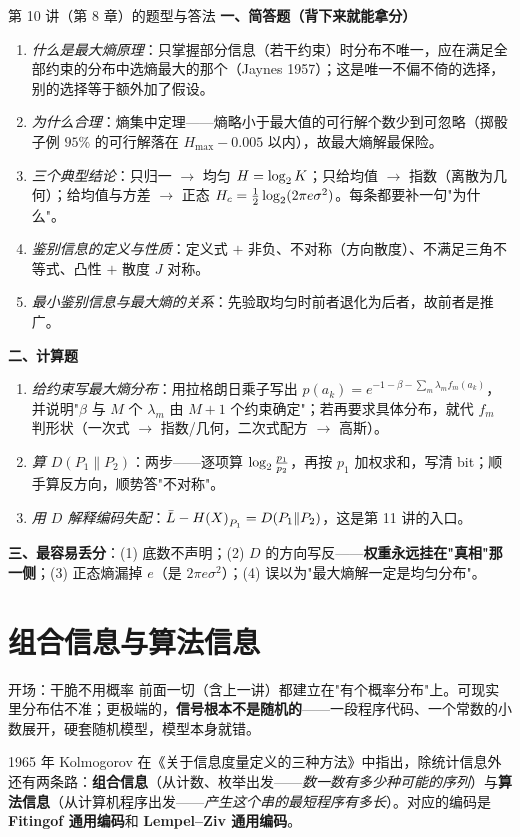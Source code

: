 \begin{exam}{第 10 讲（第 8 章）的题型与答法}
\textbf{一、简答题（背下来就能拿分）}
\begin{enumerate}[leftmargin=1.6em,itemsep=1pt,topsep=2pt]
\item \emph{什么是最大熵原理}：只掌握部分信息（若干约束）时分布不唯一，应在满足全部约束的分布中选熵最大的那个（Jaynes 1957）；这是唯一不偏不倚的选择，别的选择等于额外加了假设。
\item \emph{为什么合理}：熵集中定理——熵略小于最大值的可行解个数少到可忽略（掷骰子例 $95\%$ 的可行解落在 $H_{\max}-0.005$ 以内），故最大熵解最保险。
\item \emph{三个典型结论}：只归一 $\to$ 均匀 $H=\log_{2} K$；只给均值 $\to$ 指数（离散为几何）；给均值与方差 $\to$ 正态 $H_c=\frac12\log_{2}(2\pi e\sigma^2)$。每条都要补一句"为什么"。
\item \emph{鉴别信息的定义与性质}：定义式 $+$ 非负、不对称（方向散度）、不满足三角不等式、凸性 $+$ 散度 $J$ 对称。
\item \emph{最小鉴别信息与最大熵的关系}：先验取均匀时前者退化为后者，故前者是推广。
\end{enumerate}

\textbf{二、计算题}
\begin{enumerate}[leftmargin=1.6em,itemsep=1pt,topsep=2pt]
\item \emph{给约束写最大熵分布}：用拉格朗日乘子写出 $p(a_k)=e^{-1-\beta-\sum_m\lambda_m f_m(a_k)}$，并说明"$\beta$ 与 $M$ 个 $\lambda_m$ 由 $M+1$ 个约束确定"；若再要求具体分布，就代 $f_m$ 判形状（一次式 $\to$ 指数/几何，二次式配方 $\to$ 高斯）。
\item \emph{算 $D(P_1\|P_2)$}：两步——逐项算 $\log_{2}\frac{p_1}{p_2}$，再按 $p_1$ 加权求和，写清 bit；顺手算反方向，顺势答"不对称"。
\item \emph{用 $D$ 解释编码失配}：$\bar L-H\!\left(X\right)_{P_1}=D(P_1\|P_2)$，这是第 11 讲的入口。
\end{enumerate}

\textbf{三、最容易丢分}：(1) 底数不声明；(2) $D$ 的方向写反——\textbf{权重永远挂在"真相"那一侧}；(3) 正态熵漏掉 $e$（是 $2\pi e\sigma^2$）；(4) 误以为"最大熵解一定是均匀分布"。
\end{exam}

\section{组合信息与算法信息}

\begin{idea}{开场：干脆不用概率}
前面一切（含上一讲）都建立在"有个概率分布"上。可现实里分布估不准；更极端的，\textbf{信号根本不是随机的}——一段程序代码、一个常数的小数展开，硬套随机模型，模型本身就错。

1965 年 Kolmogorov 在《关于信息度量定义的三种方法》中指出，除统计信息外还有两条路：\textbf{组合信息}（从计数、枚举出发——\emph{数一数有多少种可能的序列}）与\textbf{算法信息}（从计算机程序出发——\emph{产生这个串的最短程序有多长}）。对应的编码是 \textbf{Fitingof 通用编码}和 \textbf{Lempel--Ziv 通用编码}。
\end{idea}

